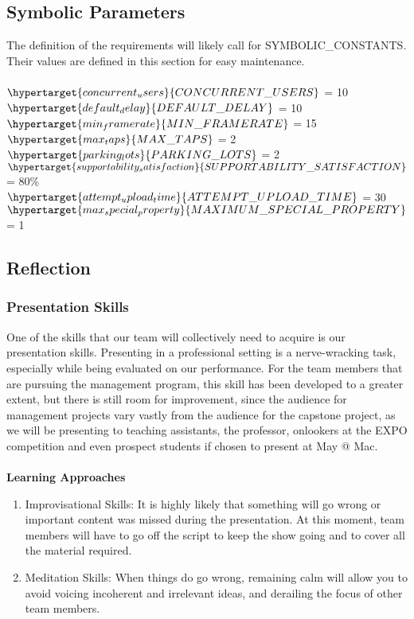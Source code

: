 \documentclass[12pt,letterpaper]{article}
\begin{document}
\subsection{Symbolic Parameters}
The definition of the requirements will likely call for SYMBOLIC\_CONSTANTS.
Their values are defined in this section for easy maintenance.\\ \\
$\hypertarget{concurrent_users}{CONCURRENT\_USERS}$ = 10 \\
$\hypertarget{default_delay}{DEFAULT\_DELAY}$ = 10 \\
$\hypertarget{min_framerate}{MIN\_FRAMERATE}$ = 15 \\
$\hypertarget{max_taps}{MAX\_TAPS}$ = 2 \\
$\hypertarget{parking_lots}{PARKING\_LOTS}$ = 2 \\
$\hypertarget{supportability_satisfaction}{SUPPORTABILITY\_SATISFACTION}$ = 80\%
\\
$\hypertarget{attempt_upload_time}{ATTEMPT\_UPLOAD\_TIME}$ = 30 \\
$\hypertarget{max_special_property}{MAXIMUM\_SPECIAL\_PROPERTY}$ = 1 \\

\subsection{Reflection}
\label{reflection}
\subsubsection{Presentation Skills}
One of the skills that our team will collectively need to acquire is our
presentation skills. Presenting in a professional setting is a nerve-wracking
task, especially while being evaluated on our performance. For the team members
that are pursuing the management program, this skill has been developed to a
greater extent, but there is still room for improvement, since the audience for
management projects vary vastly from the audience for the capstone project, as
we will be presenting to teaching assistants, the professor, onlookers at the
EXPO competition and even prospect students if chosen to present at May @ Mac.
\\
\\
\noindent \textbf{Learning Approaches}
\begin{enumerate}
    \item Improvisational Skills: It is highly likely that something will go
    wrong or important content was missed during the presentation. At this
    moment, team members will have to go off the script to keep the show going
    and to cover all the material required. 
    \item Meditation Skills: When things do go wrong, remaining calm will allow
    you to avoid voicing incoherent and irrelevant ideas, and derailing the
    focus of other team members.
\end{enumerate}
\end{document}
